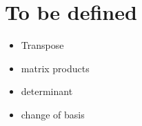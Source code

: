 \newpage

\section{To be defined}\label{tbd}
\begin{itemize}
  \item Transpose
  \item matrix products
  \item determinant
  \item change of basis
\end{itemize}